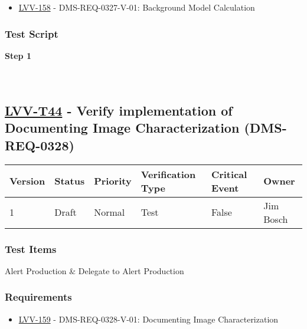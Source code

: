 \begin{itemize}
\tightlist
\item
  \href{https://jira.lsstcorp.org/browse/LVV-158}{LVV-158} -
  DMS-REQ-0327-V-01: Background Model Calculation
\end{itemize}

\hypertarget{test-script-20}{%
\subsubsection{Test Script}\label{test-script-20}}

\textbf{Step 1}\\
~\\
~\\

\hypertarget{lvv-t44---verify-implementation-of-documenting-image-characterization-dms-req-0328}{%
\subsection{\texorpdfstring{\href{https://jira.lsstcorp.org/secure/Tests.jspa\#/testCase/LVV-T44}{LVV-T44}
- Verify implementation of Documenting Image Characterization
(DMS-REQ-0328)}{LVV-T44 - Verify implementation of Documenting Image Characterization (DMS-REQ-0328)}}\label{lvv-t44---verify-implementation-of-documenting-image-characterization-dms-req-0328}}

\begin{longtable}[]{@{}llllll@{}}
\toprule
Version & Status & Priority & Verification Type & Critical Event &
Owner\tabularnewline
\midrule
\endhead
1 & Draft & Normal & Test & False & Jim Bosch\tabularnewline
\bottomrule
\end{longtable}

\hypertarget{test-items-20}{%
\subsubsection{Test Items}\label{test-items-20}}

Alert Production \& Delegate to Alert Production

\hypertarget{requirements-21}{%
\subsubsection{Requirements}\label{requirements-21}}

\begin{itemize}
\tightlist
\item
  \href{https://jira.lsstcorp.org/browse/LVV-159}{LVV-159} -
  DMS-REQ-0328-V-01: Documenting Image Characterization
\end{itemize}

